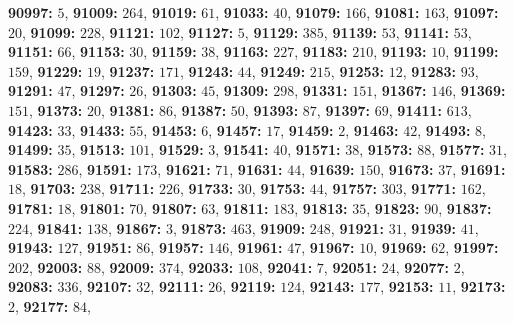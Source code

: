 \textsf{\bfseries 90997:} $5$, \textsf{\bfseries 91009:} $264$, \textsf{\bfseries 91019:} $61$, \textsf{\bfseries 91033:} $40$, \textsf{\bfseries 91079:} $166$, \textsf{\bfseries 91081:} $163$, \textsf{\bfseries 91097:} $20$, \textsf{\bfseries 91099:} $228$, \textsf{\bfseries 91121:} $102$, \textsf{\bfseries 91127:} $5$, \textsf{\bfseries 91129:} $385$, \textsf{\bfseries 91139:} $53$, \textsf{\bfseries 91141:} $53$, \textsf{\bfseries 91151:} $66$, \textsf{\bfseries 91153:} $30$, \textsf{\bfseries 91159:} $38$, \textsf{\bfseries 91163:} $227$, \textsf{\bfseries 91183:} $210$, \textsf{\bfseries 91193:} $10$, \textsf{\bfseries 91199:} $159$, \textsf{\bfseries 91229:} $19$, \textsf{\bfseries 91237:} $171$, \textsf{\bfseries 91243:} $44$, \textsf{\bfseries 91249:} $215$, \textsf{\bfseries 91253:} $12$, \textsf{\bfseries 91283:} $93$, \textsf{\bfseries 91291:} $47$, \textsf{\bfseries 91297:} $26$, \textsf{\bfseries 91303:} $45$, \textsf{\bfseries 91309:} $298$, \textsf{\bfseries 91331:} $151$, \textsf{\bfseries 91367:} $146$, \textsf{\bfseries 91369:} $151$, \textsf{\bfseries 91373:} $20$, \textsf{\bfseries 91381:} $86$, \textsf{\bfseries 91387:} $50$, \textsf{\bfseries 91393:} $87$, \textsf{\bfseries 91397:} $69$, \textsf{\bfseries 91411:} $613$, \textsf{\bfseries 91423:} $33$, \textsf{\bfseries 91433:} $55$, \textsf{\bfseries 91453:} $6$, \textsf{\bfseries 91457:} $17$, \textsf{\bfseries 91459:} $2$, \textsf{\bfseries 91463:} $42$, \textsf{\bfseries 91493:} $8$, \textsf{\bfseries 91499:} $35$, \textsf{\bfseries 91513:} $101$, \textsf{\bfseries 91529:} $3$, \textsf{\bfseries 91541:} $40$, \textsf{\bfseries 91571:} $38$, \textsf{\bfseries 91573:} $88$, \textsf{\bfseries 91577:} $31$, \textsf{\bfseries 91583:} $286$, \textsf{\bfseries 91591:} $173$, \textsf{\bfseries 91621:} $71$, \textsf{\bfseries 91631:} $44$, \textsf{\bfseries 91639:} $150$, \textsf{\bfseries 91673:} $37$, \textsf{\bfseries 91691:} $18$, \textsf{\bfseries 91703:} $238$, \textsf{\bfseries 91711:} $226$, \textsf{\bfseries 91733:} $30$, \textsf{\bfseries 91753:} $44$, \textsf{\bfseries 91757:} $303$, \textsf{\bfseries 91771:} $162$, \textsf{\bfseries 91781:} $18$, \textsf{\bfseries 91801:} $70$, \textsf{\bfseries 91807:} $63$, \textsf{\bfseries 91811:} $183$, \textsf{\bfseries 91813:} $35$, \textsf{\bfseries 91823:} $90$, \textsf{\bfseries 91837:} $224$, \textsf{\bfseries 91841:} $138$, \textsf{\bfseries 91867:} $3$, \textsf{\bfseries 91873:} $463$, \textsf{\bfseries 91909:} $248$, \textsf{\bfseries 91921:} $31$, \textsf{\bfseries 91939:} $41$, \textsf{\bfseries 91943:} $127$, \textsf{\bfseries 91951:} $86$, \textsf{\bfseries 91957:} $146$, \textsf{\bfseries 91961:} $47$, \textsf{\bfseries 91967:} $10$, \textsf{\bfseries 91969:} $62$, \textsf{\bfseries 91997:} $202$, \textsf{\bfseries 92003:} $88$, \textsf{\bfseries 92009:} $374$, \textsf{\bfseries 92033:} $108$, \textsf{\bfseries 92041:} $7$, \textsf{\bfseries 92051:} $24$, \textsf{\bfseries 92077:} $2$, \textsf{\bfseries 92083:} $336$, \textsf{\bfseries 92107:} $32$, \textsf{\bfseries 92111:} $26$, \textsf{\bfseries 92119:} $124$, \textsf{\bfseries 92143:} $177$, \textsf{\bfseries 92153:} $11$, \textsf{\bfseries 92173:} $2$, \textsf{\bfseries 92177:} $84$, 
